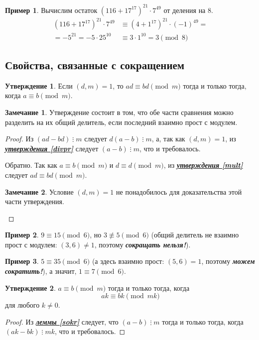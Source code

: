 \documentclass[14pt, a4paper]{extarticle}
\theoremstyle{definition}
\newtheorem*{remark}{Замечание}
\newtheorem{example}{Пример}
\newtheorem{statement}{Утверждение}
\newcommand{\divisible}{\mathop{\vdots}}
\begin{document}
	\begin{example}
		Вычислим остаток $(116+17^{17})^{21}\cdot7^{49}$ от деления на $8$.
		\begin{align*}
			(116+17^{17})^{21}\cdot7^{49}&\equiv(4+1^{17})^{21}\cdot(-1)^{49}=\\
			=-5^{21}=-5\cdot25^{10}&\equiv3\cdot1^{10}=3\pmod{8}
		\end{align*}
	\end{example}

\subsection{Свойства, связанные с сокращением}
\label{skrsr}

	\begin{statement}
	\label{sokrmod}
		Если $(d,m)=1$, то $ad\equiv bd\pmod{m}$ тогда и только тогда, когда \mbox{$a\equiv b\pmod{m}$}.
	\end{statement}
	\begin{remark}
		Утверждение состоит в том, что обе части сравнения можно разделить на их общий делитель, если последний взаимно прост с модулем.
	\end{remark}
	\begin{proof}
		Из $(ad-bd)\divisible m$ следует $d(a-b)\divisible m$, а, так как $(d,m)=1$, из \hyperref[divpr]{\textbf{\textit{утверждения \ref*{divpr}}}} следует $(a-b)\divisible m$, что и требовалось.
		
		Обратно. Так как $a\equiv b\pmod{m}$ и $d\equiv d\pmod{m}$, из \hyperref[mult]{\textbf{\textit{утверждения \ref*{mult}}}} следует $ad\equiv bd\pmod{m}$.
		\begin{remark}
			Условие $(d,m)=1$ не понадобилось для доказательства этой части утверждения.
		\end{remark}
	\end{proof}

	\begin{example}
		$9\equiv15\pmod{6}$, но $3\not\equiv5\pmod{6}$ (общий делитель не взаимно прост с модулем: $(3,6)\neq1$, поэтому \textbf{\textit{сокращать нельзя!}}).
	\end{example}
	\begin{example}
		$5\equiv35\pmod{6}$ (а здесь взаимно прост: $(5,6)=1$, поэтому \textbf{\textit{можем сократить!}}), а значит, $1\equiv7\pmod{6}$.
	\end{example}

	\begin{statement}
	\label{sokrmod2}
		$a\equiv b\pmod{m}$ тогда и только тогда, когда $$ak\equiv bk\pmod{mk}$$ для любого $k\neq0$.
	\end{statement}
	\begin{proof}
		Из \hyperref[sokr]{\textbf{\textit{леммы \ref*{sokr}}}} следует, что $(a-b)\divisible m$ тогда и только тогда, когда $(ak-bk)\divisible mk$, что и требовалось.
	\end{proof}
\end{document}
